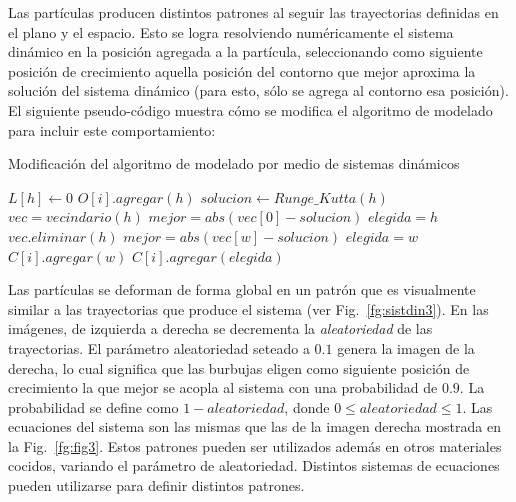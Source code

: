 \documentclass[spanish,a4paper,11pt,oneside,links]{report}
\begin{document}
Las part\'iculas producen distintos patrones al seguir las trayectorias definidas en el plano y el espacio. Esto se logra resolviendo num\'ericamente el sistema din\'amico en la posici\'on agregada a la part\'icula, seleccionando como siguiente posici\'on de crecimiento aquella posici\'on del contorno que mejor aproxima la soluci\'on del sistema din\'amico (para esto, sólo se agrega al contorno esa posición). El siguiente pseudo-código muestra cómo se modifica el algoritmo de modelado para incluir este comportamiento:

\begin{algorithm}[h!]
\caption{Modificación del algoritmo de modelado por medio de sistemas dinámicos}
\begin{algorithmic}
\State $L[h]\gets 0$ 
\State $O[i].agregar(h)$
\State $solucion \gets Runge\_Kutta(h)$
\State $vec = vecindario(h)$
\State $mejor = abs(vec[0] - solucion)$
\State $elegida = h$
\State $vec.eliminar(h)$
        \State $mejor = abs(vec[w]-solucion)$
        \State $elegida = w$
    \EndIf
        \State $C[i].agregar(w)$
    \EndIf
\EndFor
{}
\State $C[i].agregar(elegida)$
\end{algorithmic}
\end{algorithm}

Las part\'iculas se deforman de forma global en un patr\'on que es visualmente similar a las trayectorias que produce el sistema (ver Fig.~\ref{fg:sistdin3}). En las im\'agenes, de izquierda a derecha se decrementa la {\em aleatoriedad} de las trayectorias. El par\'ametro aleatoriedad seteado a $0.1$ genera la imagen de la derecha, lo cual significa que las burbujas eligen como siguiente posición de crecimiento la que mejor se acopla al sistema con una probabilidad de $0.9$. La probabilidad se define como $1-aleatoriedad$, donde $0 \leq aleatoriedad \leq 1$. Las ecuaciones del sistema son las mismas que las de la imagen derecha mostrada en la Fig.~\ref{fg:fig3}. Estos patrones pueden ser utilizados adem\'as en otros materiales cocidos, variando el par\'ametro de aleatoriedad. Distintos sistemas de ecuaciones pueden utilizarse para definir distintos patrones.
\end{document}
